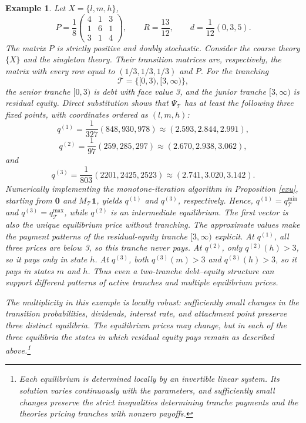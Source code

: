 \documentclass[11pt]{article}
\theoremstyle{plain}
\newtheorem{example}{Example}%
\begin{document}
\begin{example}\label{ex:multiplicity}\normalfont
Let $X=\{l,m,h\}$,
\[
P=
\frac{1}{8}
\begin{pmatrix}
4&1&3\\
1&6&1\\
3&1&4
\end{pmatrix},
\qquad
R=\frac{13}{12},
\qquad
d=\frac{1}{12}(0,3,5).
\]
The matrix $P$ is strictly positive and doubly stochastic. Consider the coarse theory $\{X\}$ and the singleton theory. Their transition matrices are, respectively, the matrix with every row equal to $(1/3,1/3,1/3)$ and $P$. For the tranching
\[
\mathcal{T}=\{[0,3),[3,\infty)\},
\]
the senior tranche $[0,3)$ is debt with face value 3, and the junior tranche $[3,\infty)$ is residual equity. Direct substitution shows that $\Psi_{\mathcal{T}}$ has at least the following three fixed points, with coordinates ordered as $(l,m,h)$:
\[
q^{(1)}=\frac{1}{327}(848,930,978)
\approx(2.593,2.844,2.991),
\]
\[
q^{(2)}=\frac{1}{97}(259,285,297)
\approx(2.670,2.938,3.062),
\]
and
\[
q^{(3)}=\frac{1}{803}(2201,2425,2523)
\approx(2.741,3.020,3.142).
\]
Numerically implementing the monotone-iteration algorithm in Proposition \ref{exu}, starting from $\mathbf{0}$ and $M_{\mathcal{T}}\mathbf{1}$, yields $q^{(1)}$ and $q^{(3)}$, respectively. Hence, $q^{(1)}=q_{\mathcal{T}}^{\min}$ and $q^{(3)}=q_{\mathcal{T}}^{\max}$, while $q^{(2)}$ is an intermediate equilibrium.
The first vector is also the unique equilibrium price without tranching. The approximate values make the payment patterns of the residual-equity tranche $[3,\infty)$ explicit. At $q^{(1)}$, all three prices are below 3, so this tranche never pays. At $q^{(2)}$, only $q^{(2)}(h)>3$, so it pays only in state $h$. At $q^{(3)}$, both $q^{(3)}(m)>3$ and $q^{(3)}(h)>3$, so it pays in states $m$ and $h$. Thus even a two-tranche debt--equity structure can support different patterns of active tranches and multiple equilibrium prices.

The multiplicity in this example is locally robust: sufficiently small changes in the transition probabilities, dividends, interest rate, and attachment point preserve three distinct equilibria. The equilibrium prices may change, but in each of the three equilibria the states in which residual equity pays remain as described above.\footnote{Each equilibrium is determined locally by an invertible linear system. Its solution varies continuously with the parameters, and sufficiently small changes preserve the strict inequalities determining tranche payments and the theories pricing tranches with nonzero payoffs.}
\end{example}
\end{document}
